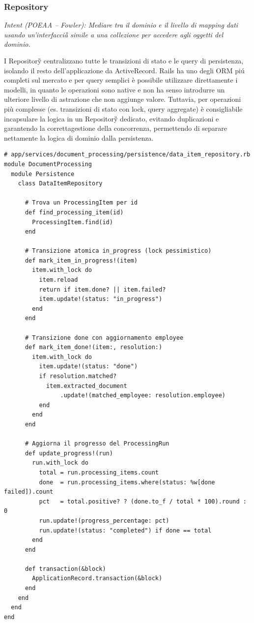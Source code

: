 \documentclass[a4paper,11pt]{article}
\begin{document}
\subsubsection{Repository}

\textit{Intent (POEAA -- Fowler): Mediare tra il dominio e il livello di mapping dati usando un'interfaccia\G{}
simile a una collezione per accedere agli oggetti del dominio.}

I Repository\G{} centralizzano tutte le transizioni di stato e le query di
persistenza, isolando il resto dell'applicazione da ActiveRecord. 
Rails ha uno degli ORM piú completi sul mercato e per query semplici è possibile utilizzare direttamente i modelli, 
in quanto le operazioni sono native e non ha senso introdurre un ulteriore livello di astrazione che non aggiunge valore.
Tuttavia, per operazioni più complesse (es. transizioni di stato con lock, query aggregate) è consigliabile incapsulare 
la logica in un Repository\G{} dedicato, evitando duplicazioni e garantendo la correttagestione della concorrenza, 
permettendo di separare nettamente la logica di dominio dalla persistenza. \\



\begin{lstlisting}[caption={DataItemRepository -- transizioni di stato con pessimistic locking}]
# app/services/document_processing/persistence/data_item_repository.rb
module DocumentProcessing
  module Persistence
    class DataItemRepository

      # Trova un ProcessingItem per id
      def find_processing_item(id)
        ProcessingItem.find(id)
      end

      # Transizione atomica in_progress (lock pessimistico)
      def mark_item_in_progress!(item)
        item.with_lock do
          item.reload
          return if item.done? || item.failed?
          item.update!(status: "in_progress")
        end
      end

      # Transizione done con aggiornamento employee
      def mark_item_done!(item:, resolution:)
        item.with_lock do
          item.update!(status: "done")
          if resolution.matched?
            item.extracted_document
                .update!(matched_employee: resolution.employee)
          end
        end
      end

      # Aggiorna il progresso del ProcessingRun
      def update_progress!(run)
        run.with_lock do
          total = run.processing_items.count
          done  = run.processing_items.where(status: %w[done failed]).count
          pct   = total.positive? ? (done.to_f / total * 100).round : 0
          run.update!(progress_percentage: pct)
          run.update!(status: "completed") if done == total
        end
      end

      def transaction(&block)
        ApplicationRecord.transaction(&block)
      end
    end
  end
end
\end{lstlisting}
\end{document}
